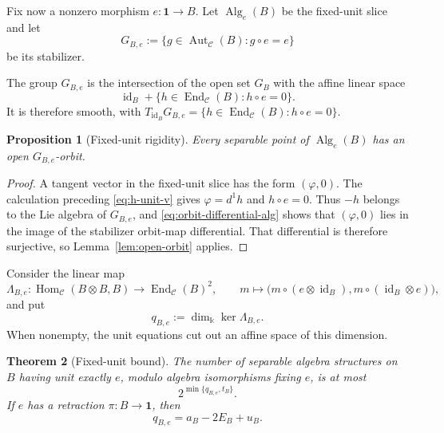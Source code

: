\documentclass[11pt]{amsart}
\newtheorem{theorem}{Theorem}[section]
\newtheorem{proposition}[theorem]{Proposition}
\theoremstyle{definition}
\theoremstyle{remark}
\newcommand{\C}{\mathcal C}
\newcommand{\one}{\mathbf 1}
\newcommand{\kk}{\Bbbk}
\DeclareMathOperator{\Hom}{Hom}
\DeclareMathOperator{\End}{End}
\DeclareMathOperator{\Aut}{Aut}
\DeclareMathOperator{\Alg}{Alg}
\DeclareMathOperator{\id}{id}
\begin{document}
Fix now a nonzero morphism $e:\one\to B$.  Let $\Alg_e(B)$ be the
fixed-unit slice and let
\[
 G_{B,e}:=\{g\in\Aut_{\C}(B):g\circ e=e\}
\]
be its stabilizer.

The group $G_{B,e}$ is the intersection of the open set $G_B$ with the
affine linear space
\[
 \id_B+\{h\in\End_{\C}(B):h\circ e=0\}.
\]
It is therefore smooth, with
$T_{\id_B}G_{B,e}=\{h\in\End_{\C}(B):h\circ e=0\}$.

\begin{proposition}[Fixed-unit rigidity]\label{prop:fixed-unit-rigidity}
Every separable point of $\Alg_e(B)$ has an open $G_{B,e}$-orbit.
\end{proposition}

\begin{proof}
A tangent vector in the fixed-unit slice has the form $(\varphi,0)$.  The
calculation preceding \eqref{eq:h-unit-v} gives $\varphi=d^1h$ and
$h\circ e=0$.  Thus $-h$ belongs to the Lie algebra of $G_{B,e}$, and
\eqref{eq:orbit-differential-alg} shows that $(\varphi,0)$ lies in the image
of the stabilizer orbit-map differential.  That differential is therefore
surjective, so Lemma~\ref{lem:open-orbit} applies.
\end{proof}

Consider the linear map
\begin{equation}\label{eq:lambda-fixed-unit}
 \Lambda_{B,e}:\Hom_{\C}(B\otimes B,B)\longrightarrow\End_{\C}(B)^2,
 \qquad
 m\longmapsto\bigl(m\circ(e\otimes\id_B),
 m\circ(\id_B\otimes e)\bigr),
\end{equation}
and put
\begin{equation}\label{eq:q-fixed-unit}
 q_{B,e}:=\dim_{\kk}\ker\Lambda_{B,e}.
\end{equation}
When nonempty, the unit equations cut out an affine space of this dimension.

\begin{theorem}[Fixed-unit bound]\label{thm:fixed-unit-bound}
The number of separable algebra structures on $B$ having unit exactly
$e$, modulo algebra isomorphisms fixing $e$, is at most
\begin{equation}\label{eq:fixed-unit-bound}
 2^{\min\{q_{B,e},t_B\}}.
\end{equation}
If $e$ has a retraction $\pi:B\to\one$, then
\begin{equation}\label{eq:q-exact}
 q_{B,e}=a_B-2E_B+u_B.
\end{equation}
\end{theorem}
\end{document}
